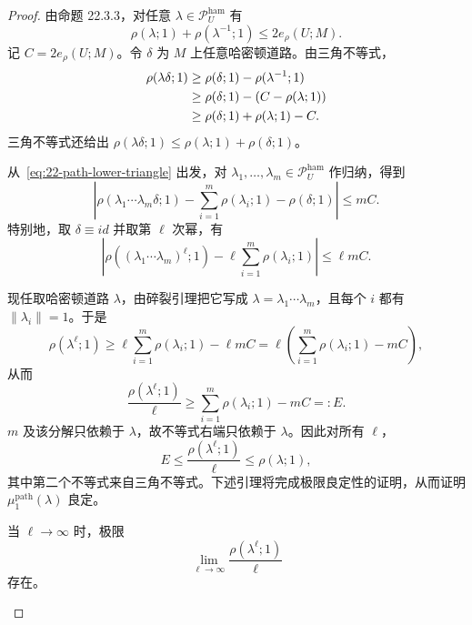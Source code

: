 \begin{proof}
由命题 22.3.3，对任意 $\lambda\in\mathcal P_U^{\mathrm{ham}}$ 有
\begin{equation}
 \rho(\lambda;1)+\rho(\lambda^{-1};1)\leq2e_\rho(U;M).
 \label{eq:22-path-inverse-bound}
\end{equation}
记 $C=2e_\rho(U;M)$。令 $\delta$ 为 $M$ 上任意哈密顿道路。由三角不等式，
\begin{align}
 \rho(\lambda\delta;1)
 &\geq\rho(\delta;1)-\rho(\lambda^{-1};1)\notag\\
 &\geq\rho(\delta;1)-(C-\rho(\lambda;1))\notag\\
 &\geq\rho(\delta;1)+\rho(\lambda;1)-C.
 \label{eq:22-path-lower-triangle}
\end{align}
三角不等式还给出
$\rho(\lambda\delta;1)\leq\rho(\lambda;1)+\rho(\delta;1)$。

从~\eqref{eq:22-path-lower-triangle} 出发，对
$\lambda_1,\ldots,\lambda_m\in\mathcal P_U^{\mathrm{ham}}$ 作归纳，得到
\begin{equation}
 \left|\rho(\lambda_1\cdots\lambda_m\delta;1)
 -\sum_{i=1}^m\rho(\lambda_i;1)-\rho(\delta;1)\right|\leq mC.
 \label{eq:22-fragment-product-bound}
\end{equation}
特别地，取 $\delta\equiv id$ 并取第 $\ell$ 次幂，有
\begin{equation}
 \left|\rho((\lambda_1\cdots\lambda_m)^\ell;1)
 -\ell\sum_{i=1}^m\rho(\lambda_i;1)\right|\leq\ell mC.
 \label{eq:22-fragment-power-bound}
\end{equation}

现任取哈密顿道路 $\lambda$，由碎裂引理把它写成
$\lambda=\lambda_1\cdots\lambda_m$，且每个 $i$ 都有
$\lVert\lambda_i\rVert=1$。于是
\[
 \rho(\lambda^\ell;1)
 \geq\ell\sum_{i=1}^m\rho(\lambda_i;1)-\ell mC
 =\ell\left(\sum_{i=1}^m\rho(\lambda_i;1)-mC\right),
\]
从而
\[
 \frac{\rho(\lambda^\ell;1)}{\ell}
 \geq\sum_{i=1}^m\rho(\lambda_i;1)-mC=:E.
\]
$m$ 及该分解只依赖于 $\lambda$，故不等式右端只依赖于 $\lambda$。因此对所有
$\ell$，
\begin{equation}
 E\leq\frac{\rho(\lambda^\ell;1)}{\ell}\leq\rho(\lambda;1),
 \label{eq:22-asymptotic-bounds}
\end{equation}
其中第二个不等式来自三角不等式。下述引理将完成极限良定性的证明，从而证明
$\mu_1^{\mathrm{path}}(\lambda)$ 良定。

\begin{lemma}
\label{lem:22-asymptotic-limit}
当 $\ell\to\infty$ 时，极限
\[
 \lim_{\ell\to\infty}\frac{\rho(\lambda^\ell;1)}{\ell}
\]
存在。
\end{lemma}


\end{proof}
